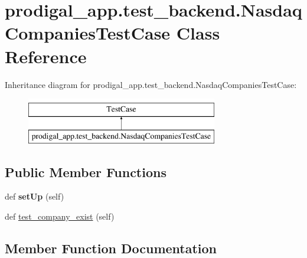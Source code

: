 \hypertarget{classprodigal__app_1_1test__backend_1_1_nasdaq_companies_test_case}{}\section{prodigal\+\_\+app.\+test\+\_\+backend.\+Nasdaq\+Companies\+Test\+Case Class Reference}
\label{classprodigal__app_1_1test__backend_1_1_nasdaq_companies_test_case}
Inheritance diagram for prodigal\+\_\+app.\+test\+\_\+backend.\+Nasdaq\+Companies\+Test\+Case\+:\begin{figure}[H]
\begin{center}
\leavevmode
\includegraphics[height=2.000000cm]{classprodigal__app_1_1test__backend_1_1_nasdaq_companies_test_case}
\end{center}
\end{figure}
\subsection*{Public Member Functions}
\begin{DoxyCompactItemize}
\item 
\mbox{\label{classprodigal__app_1_1test__backend_1_1_nasdaq_companies_test_case_ab10f2646b1ae5b2340fdacfb7c0365ad}} 
def {\bfseries set\+Up} (self)
\item 
def \mbox{\hyperlink{classprodigal__app_1_1test__backend_1_1_nasdaq_companies_test_case_a51a648b30506bf5909d32f78119b8c75}{test\+\_\+company\+\_\+exist}} (self)
\end{DoxyCompactItemize}


\subsection{Member Function Documentation}
\mbox{\label{classprodigal__app_1_1test__backend_1_1_nasdaq_companies_test_case_a51a648b30506bf5909d32f78119b8c75}} 

